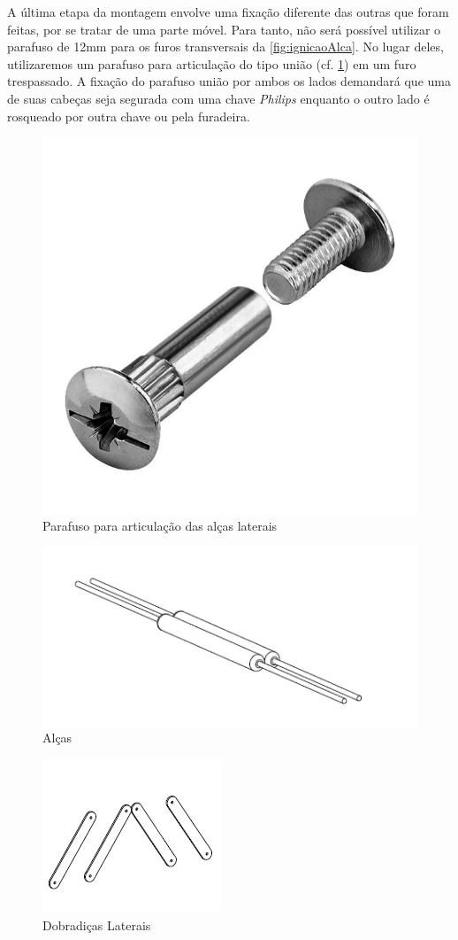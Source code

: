 A última etapa da montagem envolve uma fixação diferente das outras que foram feitas, por se tratar de uma parte móvel. Para tanto, não será possível utilizar o parafuso de 12mm para os furos transversais da \ref{fig:ignicaoAlca}. No lugar deles, utilizaremos um parafuso para articulação do tipo união (cf. \ref{fig:parafusoUniao}) em um furo trespassado. A fixação do parafuso união por ambos os lados demandará que uma de suas cabeças seja segurada com uma chave \textit{Philips} enquanto o outro lado é rosqueado por outra chave ou pela furadeira.

\begin{figure}[H]
    \centering
    \includegraphics[width=.3\textwidth]{Figuras/montagemMaletasEstrutura/parafusoUniao.jpg}
    \caption{Parafuso para articulação das alças laterais}
    \label{fig:parafusoUniao}
\end{figure}

\begin{figure} [H]
    \centering
    \includegraphics[width=.5\textwidth]{Figuras/suporte/alcas.png}
    \caption{Alças}
\end{figure}

\begin{figure} [H]
    \centering
    \includegraphics[width=.5\textwidth]{Figuras/suporte/dobradicas_laterais.png}
    \caption{Dobradiças Laterais}
\end{figure}

